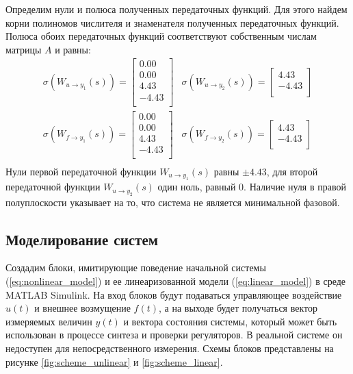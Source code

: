 Определим нули и полюса полученных передаточных функций. Для этого найдем корни полиномов числителя и знаменателя 
полученных передаточных функций. 
Полюса обоих передаточных функций соответствуют собственным числам матрицы $A$ и равны:
\begin{equation}
    \begin{array}{cccc}
        \sigma(W_{u \rightarrow y_1}(s)) = \begin{bmatrix}
        0.00 \\ 
        0.00 \\ 
        4.43 \\ 
        -4.43 \\ 
        \end{bmatrix}  & 
        \sigma(W_{u \rightarrow y_2}(s)) = \begin{bmatrix}
        4.43 \\ 
        -4.43 \\ 
        \end{bmatrix} \\[4em]
        \sigma(W_{f \rightarrow y_1}(s)) = \begin{bmatrix}
        0.00 \\ 
        0.00 \\ 
        4.43 \\ 
        -4.43 \\ 
        \end{bmatrix}  & 
        \sigma(W_{f \rightarrow y_2}(s)) = \begin{bmatrix}
        4.43 \\ 
        -4.43 \\ 
        \end{bmatrix} \\ 
    \end{array}
\end{equation}
Нули первой передаточной функции $W_{u \rightarrow y_1}(s)$ равны $\pm 4.43$, 
для второй передаточной функции $W_{u \rightarrow y_2}(s)$ один ноль, равный $0$. Наличие 
нуля в правой полуплоскости указывает на то, что система не является минимальной фазовой. 


\subsection{Моделирование систем}
Создадим блоки, имитирующие поведение начальной системы (\ref{eq:nonlinear_model}) и ее линеаризованной модели (\ref{eq:linear_model})
в среде MATLAB Simulink. На вход блоков будут подаваться управляющее воздействие $u(t)$ и внешнее возмущение $f(t)$, 
а на выходе будет получаться вектор измеряемых величин $y(t)$ и вектора состояния системы, который может быть 
использован в процессе синтеза и проверки регуляторов. В реальной системе он недоступен для непосредственного измерения.
Схемы блоков представлены на рисунке \ref{fig:scheme_unlinear} и \ref{fig:scheme_linear}. 

